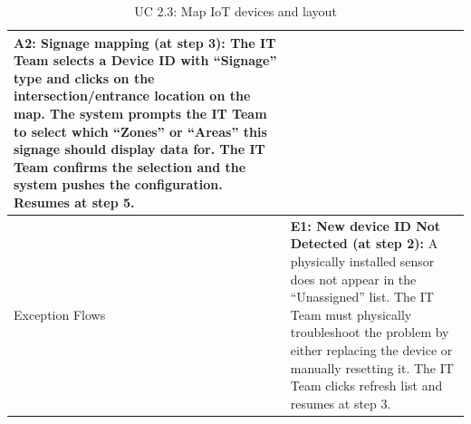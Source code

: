 \begin{table}[H]
\begin{tabularx}{\textwidth}{|>{\raggedright\arraybackslash}p{3.5cm}|>{\RaggedRight\arraybackslash}X|}
\textbf{A2: Signage mapping (at step 3):} The IT Team selects a Device ID with ``Signage'' type and clicks on the intersection/entrance location on the map. The system prompts the IT Team to select which ``Zones'' or ``Areas'' this signage should display data for. The IT Team confirms the selection and the system pushes the configuration. Resumes at step 5. \\
\hline
Exception Flows & 
\textbf{E1: New device ID Not Detected (at step 2):} A physically installed sensor does not appear in the ``Unassigned'' list. The IT Team must physically troubleshoot the problem by either replacing the device or manually resetting it. The IT Team clicks refresh list and resumes at step 3. \\
\hline
\end{tabularx}
\caption{UC 2.3: Map IoT devices and layout}
\label{tab:uc2.3}
\end{table}